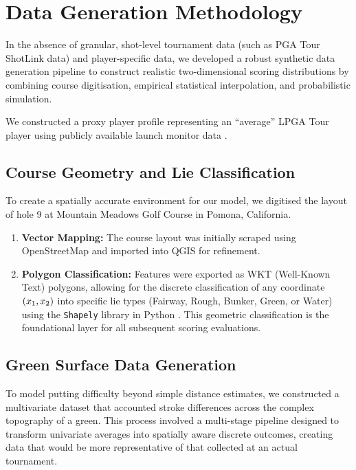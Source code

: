 \documentclass[11pt, letterpaper]{article}
\begin{document}
\appendix
\section{Data Generation Methodology}
\label{sec:Appendix}
In the absence of granular, shot-level tournament data (such as PGA Tour ShotLink data) and player-specific data, we developed a robust synthetic data generation pipeline to construct realistic two-dimensional scoring distributions by combining course digitisation, empirical statistical interpolation, and probabilistic simulation.

We constructed a proxy player profile representing an ``average'' LPGA Tour player using publicly available launch monitor data \parencite{trackman2024averages}.

\subsection{Course Geometry and Lie Classification}
\label{app: course-representation}

To create a spatially accurate environment for our model, we digitised the layout of hole 9 at Mountain Meadows Golf Course in Pomona, California.
\begin{enumerate}
    \item \textbf{Vector Mapping:} The course layout was initially scraped using OpenStreetMap \parencite{openstreetmap} and imported into QGIS \parencite{qgis} for refinement.
    \item \textbf{Polygon Classification:} Features were exported as WKT (Well-Known Text) polygons, allowing for the discrete classification of any coordinate $(x_1, x_2)$ into specific lie types (Fairway, Rough, Bunker, Green, or Water) using the \texttt{Shapely} library in Python \parencite{shapely}. This geometric classification is the foundational layer for all subsequent scoring evaluations.
\end{enumerate}

\subsection{Green Surface Data Generation}
\label{app: green-surface data}
To model putting difficulty beyond simple distance estimates, we constructed a multivariate dataset that accounted stroke differences across the complex topography of a green. This process involved a multi-stage pipeline designed to transform univariate averages into spatially aware discrete outcomes, creating data that would be more representative of that collected at an actual tournament.
\end{document}
